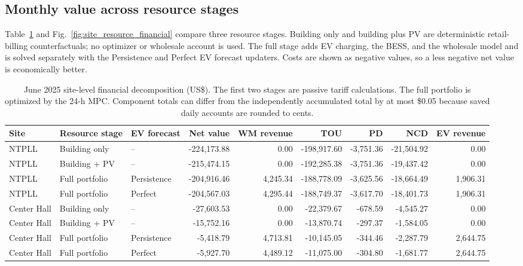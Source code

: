 \documentclass[final,5p,times]{elsarticle}
\begin{document}
\subsection{Monthly value across resource stages}
\label{sec:site_monthly_value}

Table~\ref{tab:site_monthly_results} and
Fig.~\ref{fig:site_resource_financial} compare three resource stages. Building
only and building plus PV are deterministic retail-billing counterfactuals; no
optimizer or wholesale account is used. The full stage adds EV charging, the
BESS, and the wholesale model and is solved separately with the Persistence and
Perfect EV forecast updaters. Costs are shown as negative values, so a less
negative net value is economically better.

\begin{table}[!t]
\centering
\caption{June 2025 site-level financial decomposition (US\$). The first two
stages are passive tariff calculations. The full portfolio is optimized by the
24-h MPC. Component totals can differ from the independently accumulated total
by at most \$0.05 because saved daily accounts are rounded to cents.}
\label{tab:site_monthly_results}
\scriptsize
\setlength{\tabcolsep}{4pt}
\begin{tabular}{@{}lllrrrrrr@{}}
\toprule
Site & Resource stage & EV forecast & Net value & WM revenue & TOU & PD & NCD & EV revenue\\
\midrule
NTPLL & Building only & -- & -224,173.88 & 0.00 & -198,917.60 & -3,751.36 & -21,504.92 & 0.00\\
NTPLL & Building + PV & -- & -215,474.15 & 0.00 & -192,285.38 & -3,751.36 & -19,437.42 & 0.00\\
NTPLL & Full portfolio & Persistence & -204,916.46 & 4,245.34 & -188,778.09 & -3,625.56 & -18,664.49 & 1,906.31\\
NTPLL & Full portfolio & Perfect & -204,567.03 & 4,295.44 & -188,749.37 & -3,617.70 & -18,401.73 & 1,906.31\\
\midrule
Center Hall & Building only & -- & -27,603.53 & 0.00 & -22,379.67 & -678.59 & -4,545.27 & 0.00\\
Center Hall & Building + PV & -- & -15,752.16 & 0.00 & -13,870.74 & -297.37 & -1,584.05 & 0.00\\
Center Hall & Full portfolio & Persistence & -5,418.79 & 4,713.81 & -10,145.05 & -344.46 & -2,287.79 & 2,644.75\\
Center Hall & Full portfolio & Perfect & -5,927.70 & 4,489.12 & -11,075.00 & -304.80 & -1,681.77 & 2,644.75\\
\bottomrule
\end{tabular}
\end{table}
\end{document}

